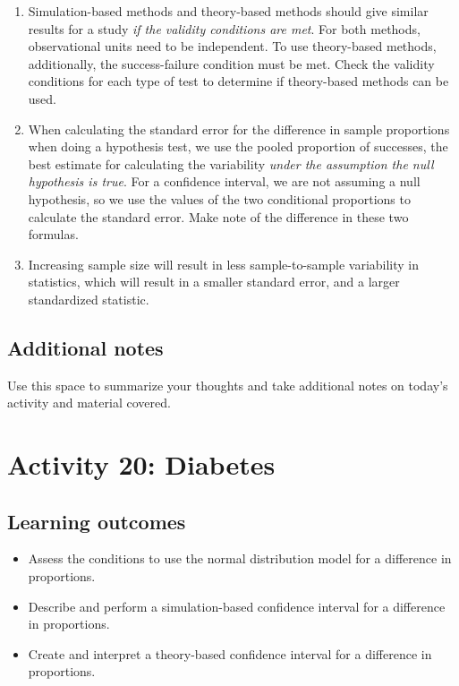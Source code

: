 \documentclass[
]{report}
\begin{document}
\begin{enumerate}
\def\labelenumi{\arabic{enumi}.}
\item
  Simulation-based methods and theory-based methods should give similar results for a study \emph{if the validity conditions are met}. For both methods, observational units need to be independent. To use theory-based methods, additionally, the success-failure condition must be met. Check the validity conditions for each type of test to determine if theory-based methods can be used.
\item
  When calculating the standard error for the difference in sample proportions when doing a hypothesis test, we use the pooled proportion of successes, the best estimate for calculating the variability \emph{under the assumption the null hypothesis is true}. For a confidence interval, we are not assuming a null hypothesis, so we use the values of the two conditional proportions to calculate the standard error. Make note of the difference in these two formulas.
\item
  Increasing sample size will result in less sample-to-sample variability in statistics, which will result in a smaller standard error, and a larger standardized statistic.
\end{enumerate}

\subsection{Additional notes}\label{additional-notes-8}

Use this space to summarize your thoughts and take additional notes on today's activity and material covered.

\newpage

\section{Activity 20: Diabetes}\label{activity-20-diabetes}


\subsection{Learning outcomes}\label{learning-outcomes-10}

\begin{itemize}
\item
  Assess the conditions to use the normal distribution model for a difference in proportions.
\item
  Describe and perform a simulation-based confidence interval for a difference in proportions.
\item
  Create and interpret a theory-based confidence interval for a difference in proportions.
\end{itemize}
\end{document}
